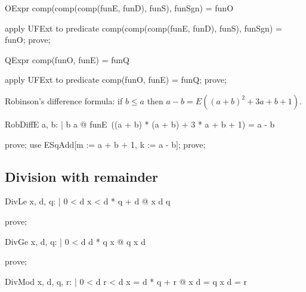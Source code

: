 \documentclass{article}
\begin{document}
\begin{theorem}{OExpr}
  comp(comp(comp(funE, funD), funS), funSgn) = funO
\end{theorem}

\begin{zproof}
apply UFExt to predicate comp(comp(comp(funE, funD), funS), funSgn) = funO;
prove;
\end{zproof}

\begin{theorem}{QExpr}
  comp(funO, funE) = funQ
\end{theorem}

\begin{zproof}
apply UFExt to predicate comp(funO, funE) = funQ;
prove;
\end{zproof}

Robinson's difference formula: if $b \le a$ then $a - b = E((a+b)^2 + 3a + b + 1)$.

\begin{theorem}{RobDiffE}
  \forall a, b: \nat | b \leq a @ funE~((a + b) * (a + b) + 3 * a + b + 1) = a - b
\end{theorem}

\begin{zproof}
prove;
use ESqAdd[m := a + b + 1, k := a - b];
prove;
\end{zproof}

\subsection{Division with remainder}

\begin{theorem}{DivLe}
  \forall x, d, q: \nat | 0 < d \land x < d * q + d @ x \div d \leq q
\end{theorem}

\begin{zproof}
prove;
\end{zproof}

\begin{theorem}{DivGe}
  \forall x, d, q: \nat | 0 < d \land d * q \leq x @ q \leq x \div d
\end{theorem}

\begin{zproof}
prove;
\end{zproof}

\begin{theorem}{DivMod}
  \forall x, d, q, r: \nat | 0 < d \land r < d \land x = d * q + r @ x \div d = q \land x \mod d = r
\end{theorem}
\end{document}
